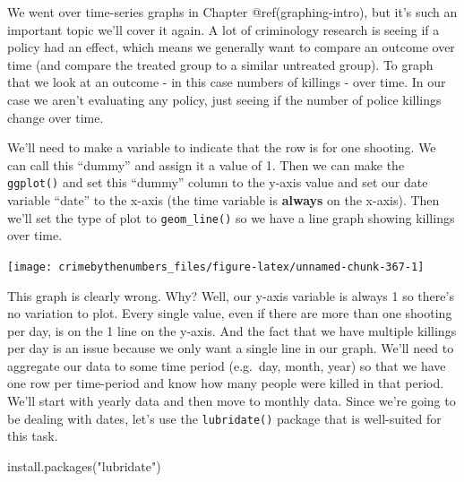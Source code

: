 \documentclass[
  a4paper,
]{krantz}
\makeatletter
\newenvironment{Shaded}{\begin{snugshade}}{\end{snugshade}}
\newcommand{\AttributeTok}[1]{\textcolor[rgb]{0.77,0.63,0.00}{#1}}
\newcommand{\DecValTok}[1]{\textcolor[rgb]{0.00,0.00,0.81}{#1}}
\newcommand{\FunctionTok}[1]{\textcolor[rgb]{0.00,0.00,0.00}{#1}}
\newcommand{\NormalTok}[1]{#1}
\newcommand{\OtherTok}[1]{\textcolor[rgb]{0.56,0.35,0.01}{#1}}
\newcommand{\SpecialCharTok}[1]{\textcolor[rgb]{0.00,0.00,0.00}{#1}}
\newcommand{\StringTok}[1]{\textcolor[rgb]{0.31,0.60,0.02}{#1}}
\newenvironment{kframe}{%
\medskip{}
\setlength{\fboxsep}{.8em}
 \def\at@end@of@kframe{}%
 \ifinner\ifhmode%
  \def\at@end@of@kframe{\end{minipage}}%
  \begin{minipage}{\columnwidth}%
 \fi\fi%
 \def\FrameCommand##1{\hskip\@totalleftmargin \hskip-\fboxsep
 \colorbox{shadecolor}{##1}\hskip-\fboxsep
     \hskip-\linewidth \hskip-\@totalleftmargin \hskip\columnwidth}%
 \MakeFramed {\advance\hsize-\width
   \@totalleftmargin\z@ \linewidth\hsize
   \@setminipage}}%
 {\par\unskip\endMakeFramed%
 \at@end@of@kframe}
\renewenvironment{Shaded}{\begin{kframe}}{\end{kframe}}
\makeatother
\begin{document}
We went over time-series graphs in Chapter
@ref(graphing-intro), but it's such an important topic we'll
cover it again. A lot of criminology research is seeing if a
policy had an effect, which means we generally want to
compare an outcome over time (and compare the treated group
to a similar untreated group). To graph that we look at an
outcome - in this case numbers of killings - over time. In
our case we aren't evaluating any policy, just seeing if the
number of police killings change over time.

We'll need to make a variable to indicate that the row is
for one shooting. We can call this ``dummy'' and assign it a
value of 1. Then we can make the \texttt{ggplot()} and set
this ``dummy'' column to the y-axis value and set our date
variable ``date'' to the x-axis (the time variable is
\textbf{always} on the x-axis). Then we'll set the type of
plot to \texttt{geom\_line()} so we have a line graph
showing killings over time.

\begin{Shaded}
\end{Shaded}

\begin{center}\texttt{[image: crimebythenumbers\_files/figure-latex/unnamed-chunk-367-1]} \end{center}

This graph is clearly wrong. Why? Well, our y-axis variable
is always 1 so there's no variation to plot. Every single
value, even if there are more than one shooting per day, is
on the 1 line on the y-axis. And the fact that we have
multiple killings per day is an issue because we only want a
single line in our graph. We'll need to aggregate our data
to some time period (e.g.~day, month, year) so that we have
one row per time-period and know how many people were killed
in that period. We'll start with yearly data and then move
to monthly data. Since we're going to be dealing with dates,
let's use the \texttt{lubridate()} package that is
well-suited for this task.

\begin{Shaded}
\begin{Highlighting}[]
\FunctionTok{install.packages}\NormalTok{(}\StringTok{"lubridate"}\NormalTok{)}
\end{Highlighting}
\end{Shaded}
\end{document}

